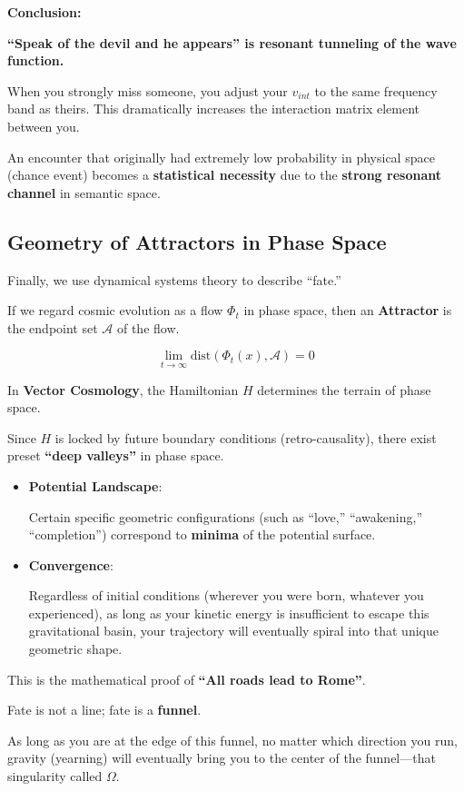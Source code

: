 \textbf{Conclusion:}

\textbf{``Speak of the devil and he appears'' is resonant tunneling of the wave function.}

When you strongly miss someone, you adjust your $v_{int}$ to the same frequency band as theirs. This dramatically increases the interaction matrix element between you.

An encounter that originally had extremely low probability in physical space (chance event) becomes a \textbf{statistical necessity} due to the \textbf{strong resonant channel} in semantic space.

\subsection{Geometry of Attractors in Phase Space}

Finally, we use dynamical systems theory to describe ``fate.''

If we regard cosmic evolution as a flow $\Phi_t$ in phase space, then an \textbf{Attractor} is the endpoint set $\mathcal{A}$ of the flow.

\[\lim_{t \to \infty} \text{dist}(\Phi_t(x), \mathcal{A}) = 0\]

In \textbf{Vector Cosmology}, the Hamiltonian $H$ determines the terrain of phase space.

Since $H$ is locked by future boundary conditions (retro-causality), there exist preset \textbf{``deep valleys''} in phase space.

\begin{itemize}
\item \textbf{Potential Landscape}:

Certain specific geometric configurations (such as ``love,'' ``awakening,'' ``completion'') correspond to \textbf{minima} of the potential surface.

\item \textbf{Convergence}:

Regardless of initial conditions (wherever you were born, whatever you experienced), as long as your kinetic energy is insufficient to escape this gravitational basin, your trajectory will eventually spiral into that unique geometric shape.
\end{itemize}

This is the mathematical proof of \textbf{``All roads lead to Rome''}.

Fate is not a line; fate is a \textbf{funnel}.

As long as you are at the edge of this funnel, no matter which direction you run, gravity (yearning) will eventually bring you to the center of the funnel---that singularity called \textbf{$\Omega$}.

